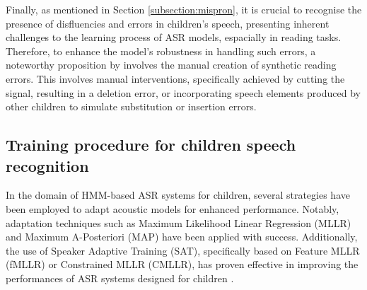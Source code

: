 Finally, as mentioned in Section \ref{subsection:mispron}, it is crucial to recognise the presence of disfluencies and errors in children's speech, presenting inherent challenges to the learning process of ASR models, espacially in reading tasks. Therefore, to enhance the model's robustness in handling such errors, a noteworthy proposition by \cite{gelin2021simulating} involves the manual creation of synthetic reading errors. This involves manual interventions, specifically achieved by cutting the signal, resulting in a deletion error, or incorporating speech elements produced by other children to simulate substitution or insertion errors.






\subsection{Training procedure for children speech recognition}%

In the domain of HMM-based ASR systems for children, several strategies have been employed to adapt acoustic models for enhanced performance. Notably, adaptation techniques such as Maximum Likelihood Linear Regression (MLLR) and Maximum A-Posteriori (MAP) have been applied with success. Additionally, the use of Speaker Adaptive Training (SAT), specifically based on Feature MLLR (fMLLR) or Constrained MLLR (CMLLR), has proven effective in improving the performances of ASR systems designed for children \cite{pronunciation, asr-improved2, children_language_model2, reviewASRchildren}.



